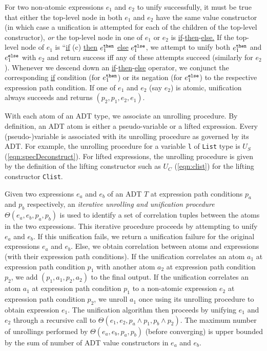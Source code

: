 For two non-atomic expressions $e_1$
and $e_2$ to unify successfully, it must be true that
either the top-level
node in both $e_1$ and $e_2$ have the same
value constructor (in which case a unification is attempted
for each of the children of the top-level constructor),
{\em or} the top-level node in one of $e_1$ or $e_2$
is \underline{if}-\underline{then}-\underline{else.} If
the top-level node of $e_1$ is ``\underline{if} (c) \underline{then} $e^{\tt then}_1$ \underline{else} $e^{\tt else}_1$,
we attempt to unify both $e^{\tt then}_1$ and $e^{\tt else}_1$ with $e_2$ and
return success iff any of these attempts succeed (similarly for $e_2$).
Whenever we descend down an \underline{if}-\underline{then}-\underline{else} operator,
we conjunct the corresponding \underline{if} condition (for $e_1^{\tt then}$) or
its negation (for $e_1^{\tt else}$) to the respective
expression path condition. If one of
$e_1$ and $e_2$ (say $e_2$) is atomic, unification always succeeds and
returns $(p_2,p_1,e_2,e_1)$.

With each atom of an ADT type, we associate an unrolling procedure.
By definition, an ADT atom is either a pseudo-variable or a lifted expression.
Every (pseudo-)variable is associated with its unrolling procedure as governed by its ADT.
For example, the unrolling procedure for a \SpecL{} variable {\tt l} of {\tt List} type
is $U_S$ (\cref{eqn:specDeconstruct}).
For lifted expressions, the unrolling procedure is given by
the definition of the lifting constructor such as $U_C$ (\cref{eqn:clist})
for the lifting constructor {\tt Clist}.

Given two expressions $e_a$ and $e_b$
of an ADT $T$ at expression path conditions $p_a$ and $p_b$
respectively, an {\em iterative
unrolling and unification procedure} $\Theta(e_a,e_b,p_a,p_b)$ is used
to identify a set of correlation tuples between the
atoms in the two expressions.
This
iterative procedure
proceeds by attempting
to unify $e_a$ and $e_b$. If this unification
fails, we return a unification failure
for the original expressions $e_a$ and $e_b$. Else, we obtain
correlation between atoms and
expressions (with their expression path conditions). If the unification
correlates an atom $a_1$ at expression path condition $p_1$
with another atom $a_2$ at expression path condition $p_2$, we add $(p_1,a_1,p_2,a_2)$
to the final output.  If the unification correlates
an atom $a_1$ at expression
path condition $p_1$ to a non-atomic expression $e_2$ at
expression path condition $p_2$,
we unroll $a_1$ once using its unrolling procedure to
obtain expression $e_1$. The unification algorithm
then proceeds by unifying $e_1$ and $e_2$ through
a recursive call to $\Theta(e_1,e_2,p_a\land{}p_1,p_b\land{}p_2)$.
The maximum number of unrollings performed by
$\Theta(e_a,e_b,p_a,p_b)$ (before converging)
is upper bounded by the sum of number of ADT value
constructors in $e_a$ and $e_b$.

